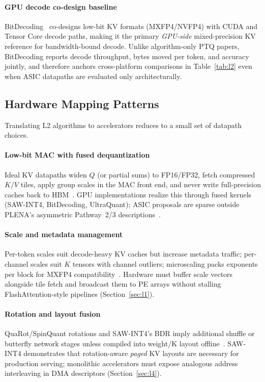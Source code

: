 \documentclass[conference]{IEEEtran}
\begin{document}
\paragraph{GPU decode co-design baseline}
BitDecoding~\cite{bitdecoding2026} co-designs low-bit KV formats (MXFP4/NVFP4) with CUDA and Tensor Core decode paths, making it the primary \emph{GPU-side} mixed-precision KV reference for bandwidth-bound decode.
Unlike algorithm-only PTQ papers, BitDecoding reports decode throughput, bytes moved per token, and accuracy jointly, and therefore anchors cross-platform comparisons in Table~\ref{tab:l2} even when ASIC datapaths are evaluated only architecturally.

\subsection{Hardware Mapping Patterns}
\label{sec:l2-hw}

Translating L2 algorithms to accelerators reduces to a small set of datapath choices.

\paragraph{Low-bit MAC with fused dequantization}
Ideal KV datapaths widen $Q$ (or partial sums) to FP16/FP32, fetch compressed $K/V$ tiles, apply group scales in the MAC front end, and never write full-precision caches back to HBM~\cite{liu2024kivi,sawint42026,plena2025}.
GPU implementations realize this through fused kernels (SAW-INT4, BitDecoding, UltraQuant); ASIC proposals are sparse outside PLENA's asymmetric Pathway~2/3 descriptions~\cite{plena2025}.

\paragraph{Scale and metadata management}
Per-token scales suit decode-heavy KV caches but increase metadata traffic; per-channel scales suit $K$ tensors with channel outliers; microscaling packs exponents per block for MXFP4 compatibility~\cite{bitdecoding2026,batquant2026}.
Hardware must buffer scale vectors alongside tile fetch and broadcast them to PE arrays without stalling FlashAttention-style pipelines (Section~\ref{sec:l1}).

\paragraph{Rotation and layout fusion}
QuaRot/SpinQuant rotations and SAW-INT4's BDR imply additional shuffle or butterfly network stages unless compiled into weight/K layout offline~\cite{ashkboos2024quarot,sawint42026}.
SAW-INT4 demonstrates that rotation-aware \emph{paged} KV layouts are necessary for production serving; monolithic accelerators must expose analogous address interleaving in DMA descriptors (Section~\ref{sec:l4}).
\end{document}
